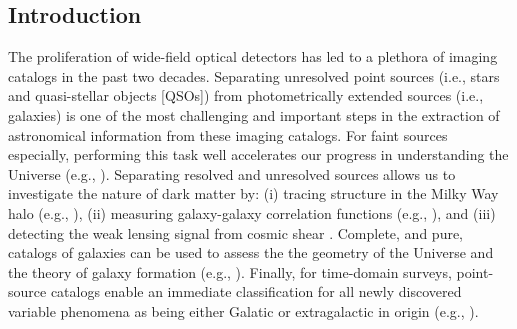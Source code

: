 \documentclass[twocolumn, dvipdfmx]{aastex62}
\begin{document}
\begin{CJK*}{UTF8}{gbsn}


\section{Introduction}\label{sec:intro}

The proliferation of wide-field optical detectors has led to a plethora of
imaging catalogs in the past two decades. Separating unresolved point
sources (i.e., stars and quasi-stellar objects [QSOs]) from photometrically
extended sources (i.e., galaxies) is one of the most challenging and
important steps in the extraction of astronomical information from these
imaging catalogs. For faint sources especially, performing this task well
accelerates our progress in understanding the Universe (e.g.,
\citealt{Sevilla18}). Separating resolved and unresolved sources allows us
to investigate the nature of dark matter by: (i) tracing structure in the
Milky Way halo (e.g., \citealt{Belokurov06}), (ii) measuring galaxy-galaxy
correlation functions (e.g., \citealt{Ross11, Ho15}), and (iii) detecting
the weak lensing signal from cosmic shear \citep{Soumagnac15}. Complete, and
pure, catalogs of galaxies can be used to assess the the geometry of the
Universe \citep{Yasuda01} and the theory of galaxy formation (e.g.,
\citealt{Loveday12, Moorman15}). Finally, for time-domain surveys,
point-source catalogs enable an immediate classification for all newly
discovered variable phenomena as being either Galatic or extragalactic in
origin (e.g., \citealt{Berger12,Miller17}).


\end{CJK*}
\end{document}
